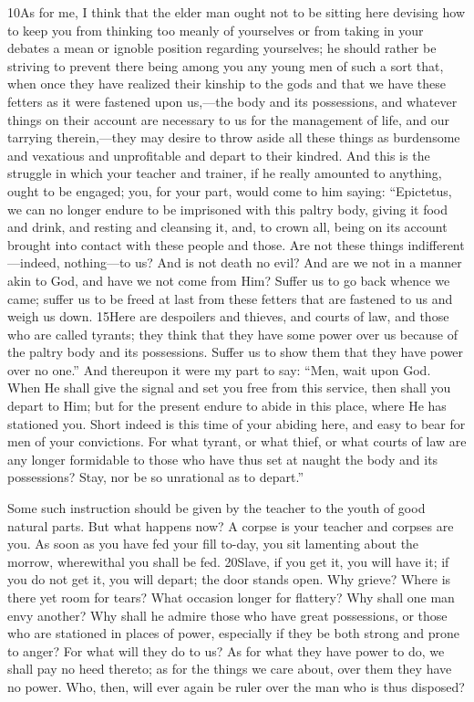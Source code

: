 10As for me, I think that the elder man ought not to be sitting here devising how to keep you from thinking too meanly of yourselves or from taking in your debates a mean or ignoble position regarding yourselves; he should rather be striving to prevent there being among you any young men of such a sort that, when once they have realized their kinship to the gods and that we have these fetters as it were fastened upon us,—the body and its possessions, and whatever things on their account are necessary to us for the management of life, and our tarrying therein,—they may desire to throw aside all these things as burdensome and vexatious and unprofitable and depart to their kindred. And this is the struggle in which your teacher and trainer, if he really amounted to anything, ought to be engaged; you, for your part, would come to him saying: ``Epictetus, we can no longer endure to be imprisoned with this paltry body, giving it food and drink, and resting and cleansing it, and, to crown all, being on its account brought into contact with these people and those. Are not these things indifferent—indeed, nothing—to us? And is not death no evil? And are we not in a manner akin to God, and have we not come from Him? Suffer us to go back whence we came; suffer us to be freed at last from these fetters that are fastened to us and weigh us down. 15Here are despoilers and thieves, and courts of law, and those who are called tyrants; they think that they have some power over us because of the paltry body and its possessions. Suffer us to show them that they have power over no one.'' And thereupon it were my part to say: ``Men, wait upon God. When He shall give the signal and set you free from this service, then shall you depart to Him; but for the present endure to abide in this place, where He has stationed you. Short indeed is this time of your abiding here, and easy to bear for men of your convictions. For what tyrant, or what thief, or what courts of law are any longer formidable to those who have thus set at naught the body and its possessions? Stay, nor be so unrational as to depart.''

Some such instruction should be given by the teacher to the youth of good natural parts. But what happens now? A corpse is your teacher and corpses are you. As soon as you have fed your fill to-day, you sit lamenting about the morrow, wherewithal you shall be fed. 20Slave, if you get it, you will have it; if you do not get it, you will depart; the door stands open. Why grieve? Where is there yet room for tears? What occasion longer for flattery? Why shall one man envy another? Why shall he admire those who have great possessions, or those who are stationed in places of power, especially if they be both strong and prone to anger? For what will they do to us? As for what they have power to do, we shall pay no heed thereto; as for the things we care about, over them they have no power. Who, then, will ever again be ruler over the man who is thus disposed?

